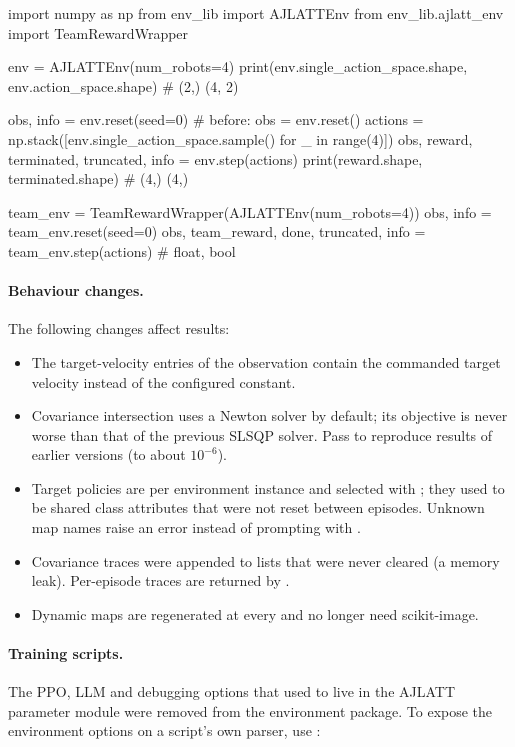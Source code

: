 \begin{pycode}
import numpy as np
from env_lib import AJLATTEnv
from env_lib.ajlatt_env import TeamRewardWrapper

env = AJLATTEnv(num_robots=4)
print(env.single_action_space.shape, env.action_space.shape)   # (2,) (4, 2)

obs, info = env.reset(seed=0)                    # before: obs = env.reset()
actions = np.stack([env.single_action_space.sample() for _ in range(4)])
obs, reward, terminated, truncated, info = env.step(actions)
print(reward.shape, terminated.shape)            # (4,) (4,)

team_env = TeamRewardWrapper(AJLATTEnv(num_robots=4))
obs, info = team_env.reset(seed=0)
obs, team_reward, done, truncated, info = team_env.step(actions)   # float, bool
\end{pycode}

\paragraph{Behaviour changes.} The following changes affect results:
\begin{itemize}
  \item The target-velocity entries of the observation contain the commanded
    target velocity instead of the configured constant.
  \item Covariance intersection uses a Newton solver by default; its objective
    is never worse than that of the previous SLSQP solver. Pass
     to reproduce results of earlier versions (to
    about $10^{-6}$).
  \item Target policies are per environment instance and selected with
    ; they used to be shared class attributes that were
    not reset between episodes. Unknown map names raise an error instead of
    prompting with .
  \item Covariance traces were appended to lists that were never cleared (a
    memory leak). Per-episode traces are returned by
    .
  \item Dynamic maps are regenerated at every  and no longer
    need scikit-image.
\end{itemize}

\paragraph{Training scripts.}
The PPO, LLM and debugging options that used to live in the AJLATT parameter
module were removed from the environment package. To expose the environment
options on a script's own parser, use :

